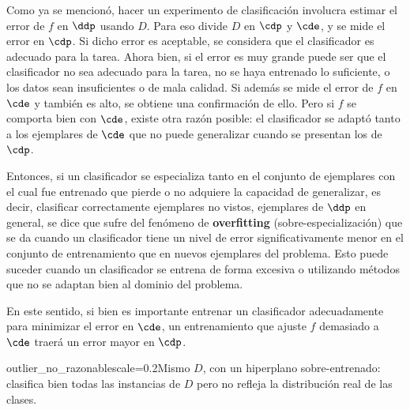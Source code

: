 Como ya se mencionó, hacer un experimento de clasificación involucra estimar el error de $f$ en $\ddp$ usando $D$. Para eso divide $D$ en $\cdp$ y $\cde$, y se mide el error en $\cdp$. Si dicho error es aceptable, se considera que el clasificador es adecuado para la tarea. Ahora bien, si el error es muy grande puede ser que el clasificador no sea adecuado para la tarea, no se haya entrenado lo suficiente, o los datos sean insuficientes o de mala calidad. Si además se mide el error de $f$ en $\cde$ y también es alto, se obtiene una confirmación de ello. Pero si $f$ se comporta bien con $\cde$, existe otra razón posible: el clasificador se adaptó tanto a los ejemplares de $\cde$ que no puede generalizar cuando se presentan los de $\cdp$.

Entonces, si un clasificador se especializa tanto en el conjunto de ejemplares con el cual fue entrenado que pierde o no adquiere la capacidad de generalizar, es decir, clasificar correctamente ejemplares no vistos, ejemplares de $\ddp$ en general, se dice que sufre del fenómeno de \textbf{overfitting} (sobre-especialización) que se da cuando un clasificador tiene un nivel de error significativamente menor en el conjunto de entrenamiento que en nuevos ejemplares del problema. Esto puede suceder cuando un clasificador se entrena de forma excesiva o utilizando métodos que no se adaptan bien al dominio del problema.


En este sentido, si bien es importante entrenar un clasificador adecuadamente para minimizar el error en $\cde$, un entrenamiento que ajuste $f$ demasiado a $\cde$ traerá un error mayor en $\cdp$. 

{outlier_no_razonable}{scale=0.2}{Mismo $D$, con un hiperplano sobre-entrenado: clasifica bien todas las instancias de $D$ pero no refleja la distribución real de las clases.}


